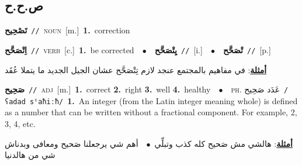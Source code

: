 \documentclass[10pt,a4paper,twoside]{article} %
\begin{document}
\begin{multicols}{2}
{{{{{{{{\vspace{-3mm}
\subsection*{\color{blue}\foreignlanguage{arabic}{ص.ح.ح}\color{blue}{}} 

{\setlength\topsep{0pt}\textbf{\foreignlanguage{arabic}{تَصْحِيح}}\ {\color{gray}\texttt{//}\color{black}}\ \textsc{noun}\ [m.]\ \textbf{1.}~correction\ 

{\setlength\topsep{0pt}\textbf{\foreignlanguage{arabic}{اِتْصَحَّح}}\ {\color{gray}\texttt{//}\color{black}}\ \textsc{verb}\ [c.]\ \textbf{1.}~be corrected\ \ $\bullet$\ \ \setlength\topsep{0pt}\textbf{\foreignlanguage{arabic}{يِتْصَحَّح}}\ {\color{gray}\texttt{//}\color{black}}\ [i.]\ \ $\bullet$\ \ \setlength\topsep{0pt}\textbf{\foreignlanguage{arabic}{تْصَحَّح}}\ {\color{gray}\texttt{//}\color{black}}\ [p.]\  \begin{flushright}\color{gray}\foreignlanguage{arabic}{\textbf{\underline{\foreignlanguage{arabic}{أمثلة}}}: في مفاهيم بالمجتمع عنجد لازم تِتْصَحَّح عشان الجيل الجديد ما يتملا عُقَد}\end{flushright}\color{black}} \vspace{2mm}

{\setlength\topsep{0pt}\textbf{\foreignlanguage{arabic}{صَحِيح}}\ {\color{gray}\texttt{//}\color{black}}\ \textsc{adj}\ [m.]\ \textbf{1.}~correct  \textbf{2.}~right  \textbf{3.}~well  \textbf{4.}~healthy\ \ $\bullet$\ \ \textsc{ph.} \color{gray} \foreignlanguage{arabic}{عَدَد صَحِيح}\color{black}\ {\color{gray}\texttt{/{\sffamily ʕadad sˤaħiːħ}/}\color{black}}\ \textbf{1.}~An integer (from the Latin integer meaning whole) is defined as a number that can be written without a fractional component. For example, 2, 3, 4, etc.\  \begin{flushright}\color{gray}\foreignlanguage{arabic}{\textbf{\underline{\foreignlanguage{arabic}{أمثلة}}}: هالشي مش صَحيح كله كذب وتبلِّي\ $\bullet$\ \  أهم شي يرجعلنا صَحيح ومعافى وبدناش شي من هالدنيا}\end{flushright}\color{black}} \vspace{2mm}

}}}}}}}}}
\end{multicols}
\end{document}
